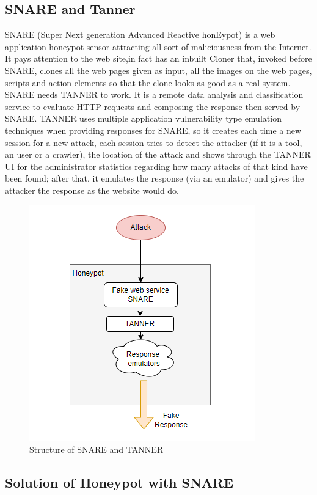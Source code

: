 \subsection{SNARE and Tanner}
SNARE (Super Next generation Advanced Reactive honEypot) is a web application honeypot sensor attracting all sort of maliciousness from the Internet.\\
It pays attention to the web site,in fact has an inbuilt Cloner that, invoked before SNARE, clones all the web pages given as input, all the images on the web pages, scripts and action elements so that the clone looks as good as a real system.\\
SNARE needs TANNER to work. It is a remote data analysis and classification service to evaluate HTTP requests and composing the response then served by SNARE. TANNER uses multiple application vulnerability type emulation techniques when providing responses for SNARE, so it creates each time a new session for a new attack, each session tries to detect the attacker (if it is a tool, an user or a crawler), the location of the attack and shows through the TANNER UI for the administrator statistics regarding how many attacks of that kind have been found; after that, it emulates the response (via an emulator) and gives the attacker the response as the website would do.

\begin{figure}[h!]
  \centering
  \includegraphics{images/DHP.png}
  \caption{Structure of SNARE and TANNER}
  \label{fig:irradiances}
\end{figure}
\FloatBarrier
\subsection{Solution of Honeypot with SNARE}

